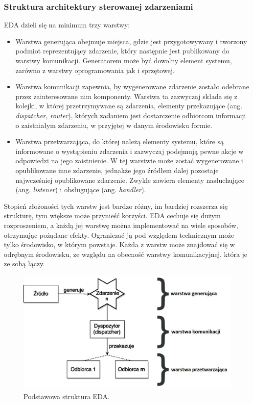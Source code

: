 \documentclass[a4paper]{book}
\newcommand{\obcy}[2]{{\selectlanguage{#1}#2}}
\newcommand{\ang}[1]{\emph{\obcy{british}{#1}}}
\begin{document}
{\subsubsection{Struktura architektury sterowanej zdarzeniami}



EDA dzieli się na minimum trzy warstwy:

\begin{itemize}
	\item Warstwa generująca obejmuje miejsca, gdzie jest przygotowywany i tworzony podmiot reprezentujący zdarzenie, który następnie jest publikowany do warstwy komunikacji. Generatorem może być dowolny element systemu, zarówno z warstwy oprogramowania jak i sprzętowej.
	\item Warstwa komunikacji zapewnia, by wygenerowane zdarzenie zostało odebrane przez zainteresowane nim komponenty. Warstwa ta zazwyczaj składa się z kolejki, w której przetrzymywane są zdarzenia, elementy przekazujące (ang. \ang{dispatcher, router}), których zadaniem jest dostarczenie odbiorcom informacji o zaistniałym zdarzeniu, w przyjętej w danym środowisku formie.
	\item Warstwa przetwarzająca, do której należą elementy systemu, które są informowane o wystąpieniu zdarzenia i zazwyczaj podejmują pewne akcje w odpowiedzi na jego zaistnienie. W tej warstwie może zostać wygenerowane i opublikowane inne zdarzenie, jednakże jego źródłem dalej pozostaje najwcześniej opublikowane zdarzenie. Zwykle zawiera elementy nasłuchujące (ang. \ang{listener}) i obsługujące (ang. \ang{handler}).
\end{itemize}

Stopień złożoności tych warstw jest bardzo różny, im bardziej rozszerza się strukturę, tym większe może przynieść korzyści. EDA cechuje się dużym rozproszeniem, a każdą jej warstwę można implementować na wiele sposobów, otrzymując pożądane efekty. Ograniczać ją pod względem technicznym może tylko środowisko, w którym powstaje. Każda z warstw może znajdować się w odrębnym środowisku, ze względu na obecność warstwy komunikacyjnej, która je ze sobą łączy.

\begin{figure}
	\centering
	\includegraphics[width=1.0\textwidth]{./img/EDA_GeneralSchema.pdf}
	\caption{Podstawowa struktura EDA.}
	\label{id:fig:1}
\end{figure}

}
\end{document}

